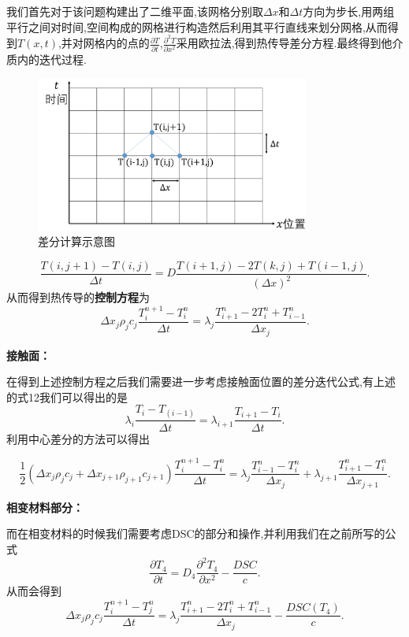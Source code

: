 \documentclass{whutmod}
\begin{document}
我们首先对于该问题构建出了二维平面,该网格分别取$\Delta x$和$\Delta t$方向为步长,用两组平行之间对时间,空间构成的网格进行构造然后利用其平行直线来划分网格,从而得到$T(x,t)$,并对网格内的点的$\frac{\partial T}{\partial t}$,$\frac{\partial^2 T}{\partial x^2}$采用欧拉法,得到热传导差分方程.最终得到他介质内的迭代过程.
\begin{figure}[!h]
	\centering
	\includegraphics[width=0.8\textwidth]{chafenshiyi.png}
	\caption{差分计算示意图}	
\end{figure}
\begin{equation}
\frac{T(i,j+1)-T(i,j)}{\Delta t}=D\frac{T(i+1,j)-2T(k,j)+T(i-1,j)}{(\Delta x)^2}.
\end{equation}
从而得到热传导的\textbf{控制方程}为
\begin{equation}
	\Delta x_j \rho_j c_j \frac{T_i^{n+1}-T_i^{n}}{\Delta t}=\lambda_j \frac{T_{i+1}^n-2T_i^n+T_{i-1}^n}{\Delta x_j}.
\end{equation}

\textbf{接触面：}

在得到上述控制方程之后我们需要进一步考虑接触面位置的差分迭代公式,有上述的式12我们可以得出的是
\begin{equation}
\lambda_i \frac{T_i-T_(i-1)}{\Delta t}=\lambda_{i+1} \frac{T_{i+1}-T_{i}}{\Delta t}.
\end{equation}
利用中心差分的方法可以得出

\begin{equation}
\frac{1}{2}\left(\Delta x_{j} \rho_{j} c_{j}+\Delta x_{j+1} \rho_{j+1} c_{j+1}\right) \frac{T_{i}^{n+1}-T_{i}^{n}}{\Delta t}=\lambda_{j} \frac{T_{i-1}^{n}-T_{i}^{n}}{\Delta x_{j}}+\lambda_{j+1} \frac{T_{i+1}^{n}-T_{i}^{n}}{\Delta x_{j+1}}.
\end{equation}

\textbf{相变材料部分：}

而在相变材料的时候我们需要考虑DSC的部分和操作,并利用我们在之前所写的公式
\begin{equation}
\frac{\partial T_{4}}{\partial t}=D_{4} \frac{\partial^{2} T_{4}}{\partial x^{2}}-\frac{D S C}{c}.
\end{equation}
从而会得到
\begin{equation}
\Delta x_j \rho_j c_j \frac{T_i^{n+1}-T_j^{n}}{\Delta t}=\lambda_j \frac{T_{i+1}^n-2T_i^n+T_{i-1}^n}{\Delta x_j}-\frac{DSC(T_4)}{c}.
\end{equation}
\end{document}
